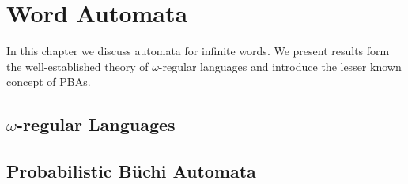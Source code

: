 \chapter{Word Automata}
In this chapter we discuss automata for infinite words. We present results form
the well-established theory of $\omega$-regular languages and introduce the
lesser known concept of \acp{PBA}.

\section{$\omega$-regular Languages}


\section{Probabilistic Büchi Automata}

